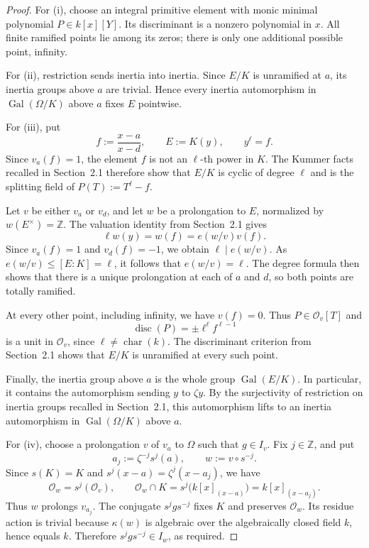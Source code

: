 \documentclass[10pt,a4paper]{amsart}
\renewcommand{\leq}{\leqslant}
\theoremstyle{definition}
\newcommand{\Z}{\mathbb Z}
\DeclareMathOperator{\Gal}{Gal}
\begin{document}
\begin{proof}
For (i), choose an integral primitive element with monic minimal polynomial $P\in k[x][Y]$. Its discriminant is a nonzero polynomial in $x$. All finite ramified points lie among its zeros; there is only one additional possible point, infinity.

For (ii), restriction sends inertia into inertia.
Since $E/K$ is unramified at $a$, its inertia groups above
$a$ are trivial. Hence every inertia automorphism in
$\Gal(\Omega/K)$ above $a$ fixes $E$ pointwise.

For (iii), put
\[
f:=\frac{x-a}{x-d},\qquad E:=K(y),\qquad y^\ell=f.
\]
Since $v_a(f)=1$, the element $f$ is not an $\ell$-th power
in $K$. The Kummer facts recalled in Section~2.1 therefore
show that $E/K$ is cyclic of degree $\ell$ and is the
splitting field of $P(T):=T^\ell-f$.

Let $v$ be either $v_a$ or $v_d$, and let $w$ be a
prolongation to $E$, normalized by $w(E^\times)=\Z$.
The valuation identity from Section~2.1 gives
\[
\ell w(y)=w(f)=e(w/v)v(f).
\]
Since $v_a(f)=1$ and $v_d(f)=-1$, we obtain
$\ell\mid e(w/v)$. As $e(w/v)\leq [E:K]=\ell$,
it follows that $e(w/v)=\ell$. The degree formula then
shows that there is a unique prolongation at each of
$a$ and $d$, so both points are totally ramified.

At every other point, including infinity, we have $v(f)=0$.
Thus $P\in\mathcal O_v[T]$ and
\[
\operatorname{disc}(P)=\pm\ell^\ell f^{\ell-1}
\]
is a unit in $\mathcal O_v$, since $\ell\ne\operatorname{char}(k)$.
The discriminant criterion from Section~2.1 shows that
$E/K$ is unramified at every such point.

Finally, the inertia group above $a$ is the whole group
$\operatorname{Gal}(E/K)$. In particular, it contains the
automorphism sending $y$ to $\zeta y$.
By the surjectivity of restriction on inertia groups recalled
in Section~2.1, this automorphism lifts to an inertia
automorphism in $\Gal(\Omega/K)$ above $a$.

For (iv), choose a prolongation $v$ of $v_a$ to $\Omega$
such that $g\in I_v$. Fix $j\in\Z$, and put
\[
a_j:=\zeta^{-j}s^j(a),\qquad w:=v\circ s^{-j}.
\]
Since $s(K)=K$ and
$s^j(x-a)=\zeta^j(x-a_j)$, we have
\[
\mathcal O_w=s^j(\mathcal O_v),\qquad
\mathcal O_w\cap K
=s^j\bigl(k[x]_{(x-a)}\bigr)
=k[x]_{(x-a_j)}.
\]
Thus $w$ prolongs $v_{a_j}$.
The conjugate $s^jgs^{-j}$ fixes $K$ and preserves
$\mathcal O_w$. Its residue action is trivial because
$\kappa(w)$ is algebraic over the algebraically closed
field $k$, hence equals $k$.
Therefore $s^jgs^{-j}\in I_w$, as required.
\end{proof}
\end{document}

